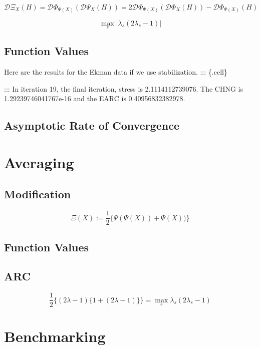 \documentclass[
  12pt,
  letterpaper,
  DIV=11,
  numbers=noendperiod]{scrartcl}
\begin{document}
\[
\mathcal{D}\Xi_X(H)=\mathcal{D}\Phi_{\Psi(X)}(\mathcal{D}\Psi_X(H))=2\mathcal{D}\Phi_{\Psi(X)}(\mathcal{D}\Phi_X(H))-\mathcal{D}\Phi_{\Psi(X)}(H)
\]

\begin{equation}
\max_s|\lambda_s(2\lambda_s-1)|
\end{equation}

\subsection{Function Values}\label{function-values-6}

Here are the results for the Ekman data if we use stabilization. :::
\{.cell\}

::: In iteration 19, the final iteration, stress is 2.1114112739076. The
CHNG is 1.29239746041767e-16 and the EARC is 0.40956832382978.

\subsection{Asymptotic Rate of
Convergence}\label{asymptotic-rate-of-convergence-7}

\section{Averaging}\label{averaging}

\subsection{Modification}\label{modification-7}

\[
\Xi(X):=\frac12\{\Psi(\Psi(X))+\Psi(X))\}
\]

\subsection{Function Values}\label{function-values-7}

\subsection{ARC}\label{arc}

\[
\frac12\{(2\lambda - 1)\{1 + (2\lambda - 1)\}\}=\max_s\lambda_s(2\lambda_s-1)
\]

\section{Benchmarking}\label{benchmarking}
\end{document}
